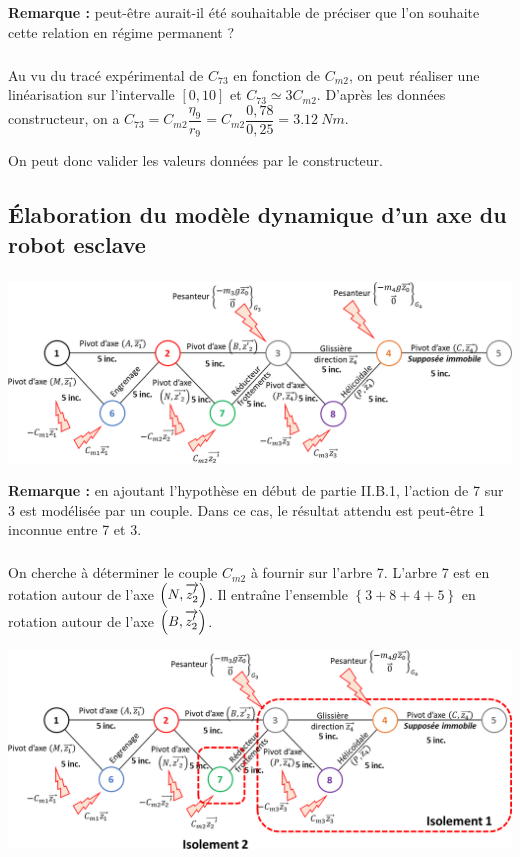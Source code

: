 \documentclass[10pt,fleqn]{article} %
\begin{document}
\textbf{Remarque :} peut-être aurait-il été souhaitable de préciser que l'on souhaite cette relation en régime permanent ?


\subparagraph{}%
Au vu du tracé expérimental de $C_{73}$ en fonction de $C_{m2}$, on peut réaliser une linéarisation sur l'intervalle $[0,10]$ et $C_{73}\simeq 3 C_{m2}$. 
D'après les données constructeur, on a $C_{73}=C_{m2}\dfrac{\eta_9}{r_9}=C_{m2}\dfrac{0,78}{0,25}=\SI{3,12}{Nm}$.

On peut donc valider les valeurs données par le constructeur.
\subsection{Élaboration du modèle dynamique d’un axe du robot esclave}


\subparagraph{}%
\begin{center}
\includegraphics[width=\textwidth]{images/fig_02}
\end{center}

\textbf{Remarque :} en ajoutant l'hypothèse en début de partie II.B.1, l'action de 7 sur 3 est modélisée par un couple. Dans ce cas, le résultat attendu est peut-être 1 inconnue entre 7 et 3.
%
\subparagraph{}%
On cherche à déterminer le couple $C_{m2}$ à fournir sur l'arbre 7. L'arbre 7 est en rotation autour de l'axe $\left(N,\overrightarrow{z_2'}\right)$. Il entraîne l'ensemble $\left\{3+8+4+5\right\}$ en rotation autour de l'axe $\left(B,\overrightarrow{z_2'}\right)$.

\begin{center}
\includegraphics[width=\textwidth]{images/fig_05}
\end{center}
\end{document}
